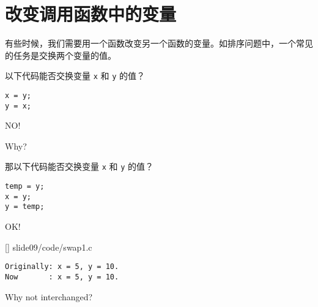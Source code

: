 \section{改变调用函数中的变量}

\begin{frame}[fragile]\ft{\secname}
有些时候，我们需要用一个函数改变另一个函数的变量。如排序问题中，一个常见的任务是交换两个变量的值。
\end{frame}

\begin{frame}[fragile]\ft{\secname}
以下代码能否交换变量 \lstinline|x| 和 \lstinline|y| 的值{\Large ？}
\begin{lstlisting}[backgroundcolor=\color{red!10}]
x = y;
y = x;
\end{lstlisting}
\pause \vspace{0.1in}

\begin{center}
{\Large NO!}
\end{center}
\pause\vspace{0.1in}

\begin{center}
{\Large Why?} 
\end{center}
\end{frame}

\begin{frame}[fragile]\ft{\secname}
那以下代码能否交换变量 \lstinline|x| 和 \lstinline|y| 的值{\Large ？}
\begin{lstlisting}[backgroundcolor=\color{red!10}]
temp = y;
x = y;
y = temp;
\end{lstlisting}
\pause \vspace{0.1in}

\begin{center}
{\Large OK!}
\end{center}

\end{frame}

\begin{frame}\ft{\secname}
  
  []
  {slide09/code/swap1.c}
\end{frame}


\begin{frame}[fragile]\ft{\secname}
\begin{lstlisting}[backgroundcolor=\color{red!10}]
Originally: x = 5, y = 10.
Now       : x = 5, y = 10.
\end{lstlisting}
\pause \vspace{0.1in}

\begin{center}
{\Large Why not interchanged?}
\end{center}


\end{frame}

